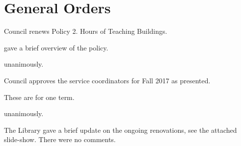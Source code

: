 \section*{General Orders}

\begin{motion}
    \birt Council renews Policy 2. Hours of Teaching Buildings.
    \movers{\brian}{\seneca}

    \tristan gave a brief overview of the policy.

    \carries unanimously.
\end{motion}

\begin{motion}
    \birt Council approves the service coordinators for Fall 2017 as presented. 
    \movers{\brian}{\ben}

    These are for one term. 

    \carries unanimously. 

\end{motion}

\begin{information}

    The Library gave a brief update on the ongoing renovations, see the
    attached slide-show. There were no comments.

\end{information}

